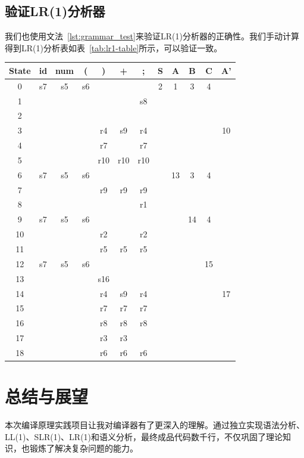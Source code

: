 \documentclass[UTF8,openany]{ctexbook}
\begin{document}
\section{验证LR(1)分析器}
我们也使用文法~\ref{lst:grammar_test}来验证LR(1)分析器的正确性。我们手动计算得到LR(1)分析表如表~\ref{tab:lr1-table}所示，可以验证一致。

\begin{table}[H]
\small
\centering
\caption{文法~\ref{lst:grammar_test}的LR(1)分析表}
\label{tab:lr1-table}
\begin{longtable}{|c|c|c|c|c|c|c||c|c|c|c|c|}
    \hline
    \textbf{State} & \textbf{id} & \textbf{num} & \textbf{(} & \textbf{)} & \textbf{+} & \textbf{;} & \textbf{S} & \textbf{A} & \textbf{B} & \textbf{C} & \textbf{A'} \\
    \hline
    0  & s7  & s5  & s6  &     &     &     & 2 & 1 & 3 & 4 &   \\
    1  &     &     &     &     &     & s8  &   &   &   &   &   \\
    2  &     &     &     &     &     &     &   &   &   &   &   \\
    3  &     &     &     & r4  & s9  & r4  &   &   &   &   & 10 \\
    4  &     &     &     & r7  &     & r7  &   &   &   &   &   \\
    5  &     &     &     & r10 & r10 & r10 &   &   &   &   &   \\
    6  & s7  & s5  & s6  &     &     &     &   & 13 & 3 & 4 &   \\
    7  &     &     &     & r9  & r9  & r9  &   &   &   &   &   \\
    8  &     &     &     &     &     & r1  &   &   &   &   &   \\
    9  & s7  & s5  & s6  &     &     &     &   &   & 14 & 4 &   \\
    10 &     &     &     & r2  &     & r2  &   &   &   &   &   \\
    11 &     &     &     & r5  & r5  & r5  &   &   &   &   &   \\
    12 & s7  & s5  & s6  &     &     &     &   &   &   & 15 &   \\
    13 &     &     &     & s16 &     &     &   &   &   &   &   \\
    14 &     &     &     & r4  & s9  & r4  &   &   &   &   & 17 \\
    15 &     &     &     & r7  & r7  & r7  &   &   &   &   &   \\
    16 &     &     &     & r8  & r8  & r8  &   &   &   &   &   \\
    17 &     &     &     & r3  & r3  &     &   &   &   &   &   \\
    18 &     &     &     & r6  & r6  & r6  &   &   &   &   &   \\
    \hline
\end{longtable}
\end{table}

\chapter{总结与展望}
\label{sec:conclusion}

本次编译原理实践项目让我对编译器有了更深入的理解。通过独立实现语法分析、LL(1)、SLR(1)、LR(1)和语义分析，最终成品代码数千行，不仅巩固了理论知识，也锻炼了解决复杂问题的能力。



\end{document}
